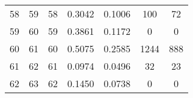 \begin{table}
\begin{adjustbox}{width=0.95\textwidth,center=\textwidth}
\begin{tabular}{ccccccc}
58                                                        & 59                                                          & 58                                                  & 0.3042                                                                    & 0.1006                                                                    & 100                                                                         & 72                                                                               \\
59                                                        & 60                                                          & 59                                                  & 0.3861                                                                    & 0.1172                                                                    & 0                                                                           & 0                                                                                \\
60                                                        & 61                                                          & 60                                                  & 0.5075                                                                    & 0.2585                                                                    & 1244                                                                        & 888                                                                              \\
61                                                        & 62                                                          & 61                                                  & 0.0974                                                                    & 0.0496                                                                    & 32                                                                          & 23                                                                               \\
62                                                        & 63                                                          & 62                                                  & 0.1450                                                                    & 0.0738                                                                    & 0                                                                           & 0                                                                                \\

\end{tabular}
\end{adjustbox}
\end{table}
